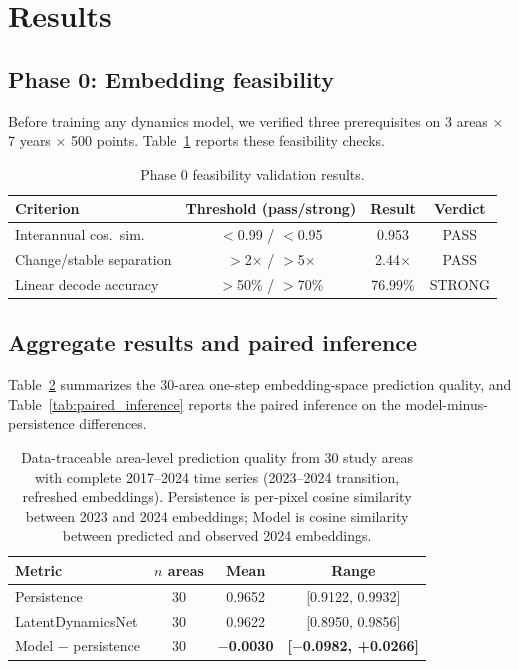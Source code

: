 \documentclass{article}
\begin{document}
\section{Results}
\label{sec:results}

\subsection{Phase 0: Embedding feasibility}

Before training any dynamics model, we verified three prerequisites on 3 areas $\times$ 7 years $\times$ 500 points. Table~\ref{tab:phase0} reports these feasibility checks.

\begin{table}[htbp]
\centering
\caption{Phase 0 feasibility validation results.}
\label{tab:phase0}
\begin{tabular}{lccc}
\toprule
Criterion & Threshold (pass/strong) & Result & Verdict \\
\midrule
Interannual cos.~sim. & $<$0.99 / $<$0.95 & 0.953 & PASS \\
Change/stable separation & $>$2$\times$ / $>$5$\times$ & 2.44$\times$ & PASS \\
Linear decode accuracy & $>$50\% / $>$70\% & 76.99\% & STRONG \\
\bottomrule
\end{tabular}
\end{table}

\subsection{Aggregate results and paired inference}

Table~\ref{tab:aggregate} summarizes the 30-area one-step embedding-space prediction quality, and Table~\ref{tab:paired_inference} reports the paired inference on the model-minus-persistence differences.

\begin{table}[htbp]
\centering
\caption{Data-traceable area-level prediction quality from 30 study areas with complete 2017--2024 time series (2023--2024 transition, refreshed embeddings). Persistence is per-pixel cosine similarity between 2023 and 2024 embeddings; Model is cosine similarity between predicted and observed 2024 embeddings.}
\label{tab:aggregate}
\begin{tabular}{lccc}
\toprule
Metric & $n$ areas & Mean & Range \\
\midrule
Persistence & 30 & 0.9652 & [0.9122, 0.9932] \\
LatentDynamicsNet & 30 & 0.9622 & [0.8950, 0.9856] \\
Model $-$ persistence & 30 & \textbf{$-$0.0030} & \textbf{[$-$0.0982, +0.0266]} \\
\bottomrule
\end{tabular}
\end{table}
\end{document}
